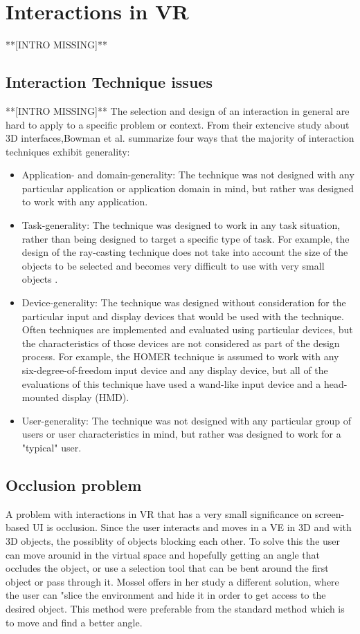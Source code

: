 \section{Interactions in VR}
**[INTRO MISSING]**
\subsection{Interaction Technique issues}
**[INTRO MISSING]**
The selection and design of an interaction in general are hard to apply to a specific problem or context. From their extencive study about 3D interfaces,Bowman et al. \cite{interactions:Bowman2006} summarize four ways that the majority of interaction techniques exhibit generality:
\begin{itemize}
  \item Application- and domain-generality: The technique was not designed with any particular application or application domain in mind, but rather was designed to work with any application.
  \item Task-generality: The technique was designed to work in any task situation, rather than being designed to target a specific type of task. For example, the design of the ray-casting technique does not take into account the size of the objects to be selected and becomes very difficult to use with very small objects \cite{interaction:Poupyrev1997}.
  \item Device-generality: The technique was designed without consideration for the particular input and display devices that would be used with the technique. Often techniques are implemented and evaluated using particular devices, but the characteristics of those devices are not considered as part of the design process. For example, the HOMER technique \cite{interactions:Bowman1997} is assumed to work with any six-degree-of-freedom input device and any display device, but all of the evaluations of this technique have used a wand-like input device and a head-mounted display (HMD).
  \item User-generality: The technique was not designed with any particular group of users or user characteristics in mind, but rather was designed to work for a "typical" user.
\end{itemize}

\subsection{Occlusion problem}
A problem with interactions in VR that has a very small significance on screen-based UI is occlusion. Since the user interacts and moves in a VE in 3D and with 3D objects, the possiblity of objects blocking each other. To solve this the user can move arounid in the virtual space and hopefully getting an angle that occludes the object, or use a selection tool that can be bent around the first object or pass through it. Mossel offers in her study a different solution, where the user can "slice the environment and hide it in order to get access to the desired object.\cite{interactions:Mossel2016}
This method were preferable from the standard method which is to move and find a better angle.
